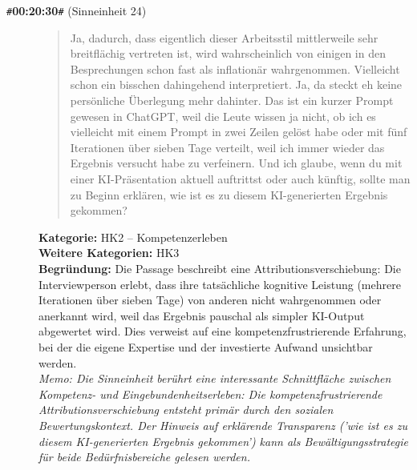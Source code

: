 \begin{description}
  \item[\texttt{\#}\textbf{00:20:30}\texttt{\#} (Sinneinheit 24)]
  \begin{quote}
  Ja, dadurch, dass eigentlich dieser Arbeitsstil mittlerweile sehr breitflächig vertreten ist, wird wahrscheinlich von einigen in den Besprechungen schon fast als inflationär wahrgenommen. Vielleicht schon ein bisschen dahingehend interpretiert. Ja, da steckt eh keine persönliche Überlegung mehr dahinter. Das ist ein kurzer Prompt gewesen in ChatGPT, weil die Leute wissen ja nicht, ob ich es vielleicht mit einem Prompt in zwei Zeilen gelöst habe oder mit fünf Iterationen über sieben Tage verteilt, weil ich immer wieder das Ergebnis versucht habe zu verfeinern. Und ich glaube, wenn du mit einer KI-Präsentation aktuell auftrittst oder auch künftig, sollte man zu Beginn erklären, wie ist es zu diesem KI-generierten Ergebnis gekommen?
  \end{quote}
  \textbf{Kategorie:} HK2 -- Kompetenzerleben\\
  \textbf{Weitere Kategorien:} HK3\\
  \textbf{Begr\"undung:} Die Passage beschreibt eine Attributionsverschiebung: Die Interviewperson erlebt, dass ihre tatsächliche kognitive Leistung (mehrere Iterationen über sieben Tage) von anderen nicht wahrgenommen oder anerkannt wird, weil das Ergebnis pauschal als simpler KI-Output abgewertet wird. Dies verweist auf eine kompetenzfrustrierende Erfahrung, bei der die eigene Expertise und der investierte Aufwand unsichtbar werden.
  \\\textit{Memo: Die Sinneinheit berührt eine interessante Schnittfläche zwischen Kompetenz- und Eingebundenheitserleben: Die kompetenzfrustrierende Attributionsverschiebung entsteht primär durch den sozialen Bewertungskontext. Der Hinweis auf erklärende Transparenz ('wie ist es zu diesem KI-generierten Ergebnis gekommen') kann als Bewältigungsstrategie für beide Bedürfnisbereiche gelesen werden.}
\end{description}
\medskip

